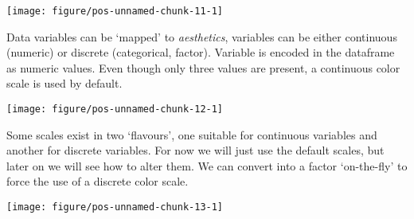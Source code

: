 \documentclass[paper=a4,10pt,div=17,headsepline,BCOR=12mm,twoside,open=right]{scrbook}\usepackage{knitr}
\begin{document}
\begin{knitrout}\footnotesize
{}\color{fgcolor}\begin{kframe}
\begin{alltt}
  \hlopt{+}
  \hlstd{()}
\end{alltt}
\end{kframe}

{\centering \texttt{[image: figure/pos-unnamed-chunk-11-1]} 

}



\end{knitrout}

Data variables can be `mapped' to \textit{aesthetics}, variables can be either continuous (numeric) or discrete (categorical, factor). Variable  is encoded in the  dataframe as numeric values. Even though only three values are present, a continuous color scale is used by default.

\begin{knitrout}\footnotesize
{}\color{fgcolor}\begin{kframe}
\begin{alltt}
\hlstd{(} 
       \hlstd{(}      \hlopt{+}
  \hlstd{()}
\end{alltt}
\end{kframe}

{\centering \texttt{[image: figure/pos-unnamed-chunk-12-1]} 

}



\end{knitrout}

Some scales exist in two `flavours', one suitable for continuous variables and another for discrete variables. For now we will just use the default scales, but later on we will see how to alter them. We can convert  into a factor `on-the-fly' to force the use of a discrete color scale.

\begin{knitrout}\footnotesize
{}\color{fgcolor}\begin{kframe}
\begin{alltt}
\hlstd{(} 
       \hlstd{(}     \hlstd{=}  \hlopt{+}
  \hlstd{()}
\end{alltt}
\end{kframe}

{\centering \texttt{[image: figure/pos-unnamed-chunk-13-1]} 

}



\end{knitrout}
\end{document}

